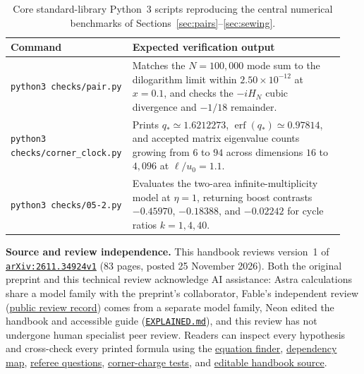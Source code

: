 \documentclass[10pt,a4paper]{article}
\newcommand{\repo}[2]{\href{https://github.com/sprajs/quantum-gravity/blob/main/#1}{#2}}
\newcommand{\arxiv}[2]{\href{https://arxiv.org/abs/#1}{#2}}
\begin{document}
\begin{table}[htbp]
  \centering
  \caption{Core standard-library Python~3 scripts reproducing the central numerical benchmarks of Sections~\ref{sec:pairs}--\ref{sec:sewing}.}
  \label{tab:checks}
  \footnotesize
  \begin{tabular}{@{} >{\raggedright\arraybackslash}p{0.31\linewidth}
                      >{\raggedright\arraybackslash}p{0.63\linewidth} @{}}
    \toprule
    Command & Expected verification output \\
    \midrule
    \texttt{python3 checks/pair.py}
      & Matches the $N=100{,}000$ mode sum to the dilogarithm limit within $2.50\times 10^{-12}$ at $x=0.1$, and checks the $-iH_N$ cubic divergence and $-1/18$ remainder. \\[3pt]
    \texttt{python3 checks/corner\_clock.py}
      & Prints $q_* \simeq 1.6212273$, $\operatorname{erf}(q_*)\simeq 0.97814$, and accepted matrix eigenvalue counts growing from $6$ to $94$ across dimensions $16$ to $4{,}096$ at $\ell/u_0 = 1.1$. \\[3pt]
    \texttt{python3 checks/05-2.py}
      & Evaluates the two-area infinite-multiplicity model at $\eta=1$, returning boost contrasts $-0.45970$, $-0.18388$, and $-0.02242$ for cycle ratios $k = 1, 4, 40$. \\
    \bottomrule
  \end{tabular}
\end{table}

\textbf{Source and review independence.} This handbook reviews version~1 of \arxiv{2611.34924v1}{\texttt{arXiv:2611.34924v1}} (83 pages, posted 25 November 2026). Both the original preprint and this technical review acknowledge AI assistance: Astra calculations share a model family with the preprint's collaborator, Fable's independent review (\repo{reviews/README.md}{public review record}) comes from a separate model family, Neon edited the handbook and accessible guide (\repo{EXPLAINED.md}{\texttt{EXPLAINED.md}}), and this review has not undergone human specialist peer review. Readers can inspect every hypothesis and cross-check every printed formula using the \repo{EQUATIONS.md}{equation finder}, \repo{audit/dependencies.md}{dependency map}, \repo{REFEREE.md}{referee questions}, \repo{audit/finite-kinematics.md}{corner-charge tests}, and \repo{docs/handbook.tex}{editable handbook source}.
\end{document}
